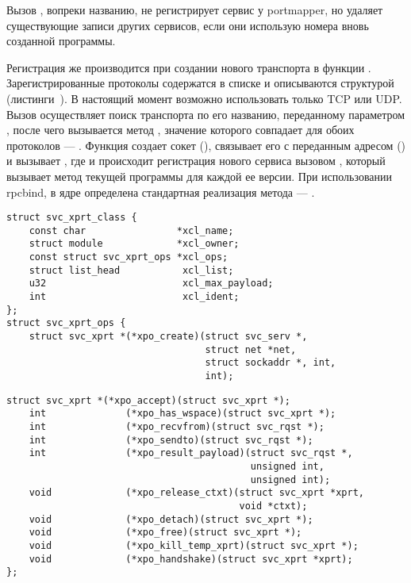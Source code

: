 Вызов , вопреки названию, не регистрирует сервис у portmapper,
но удаляет существующие записи других сервисов, если они использую номера вновь
созданной программы.

Регистрация же производится при создании нового транспорта в функции
. Зарегистрированные протоколы содержатся в списке
 и описываются структурой 
(листинги~). В
настоящий момент возможно использовать только TCP или UDP. Вызов
 осуществляет поиск транспорта по его названию,
переданному параметром , после чего вызывается метод
, значение которого совпадает для обоих протоколов ---
. Функция создает сокет (),
связывает его с переданным адресом () и вызывает
, где и происходит регистрация нового сервиса вызовом
, который вызывает метод  текущей
программы для каждой ее версии. При использовании rpcbind, в ядре определена
стандартная реализация метода --- .

\begin{lstlisting}[caption={Структура транспортного протокола (часть 1)}, label={lst:struct_svc_xprt_class1}]
struct svc_xprt_class {
    const char                *xcl_name;
    struct module             *xcl_owner;
    const struct svc_xprt_ops *xcl_ops;
    struct list_head           xcl_list;
    u32                        xcl_max_payload;
    int                        xcl_ident;
};
struct svc_xprt_ops {
    struct svc_xprt *(*xpo_create)(struct svc_serv *,
                                   struct net *net,
                                   struct sockaddr *, int,
                                   int);
\end{lstlisting}
\begin{lstlisting}[caption={Структура транспортного протокола (часть 2)}, label={lst:struct_svc_xprt_class2}]
    struct svc_xprt *(*xpo_accept)(struct svc_xprt *);
    int              (*xpo_has_wspace)(struct svc_xprt *);
    int              (*xpo_recvfrom)(struct svc_rqst *);
    int              (*xpo_sendto)(struct svc_rqst *);
    int              (*xpo_result_payload)(struct svc_rqst *,
                                           unsigned int,
                                           unsigned int);
    void             (*xpo_release_ctxt)(struct svc_xprt *xprt,
                                         void *ctxt);
    void             (*xpo_detach)(struct svc_xprt *);
    void             (*xpo_free)(struct svc_xprt *);
    void             (*xpo_kill_temp_xprt)(struct svc_xprt *);
    void             (*xpo_handshake)(struct svc_xprt *xprt);
};
\end{lstlisting}

